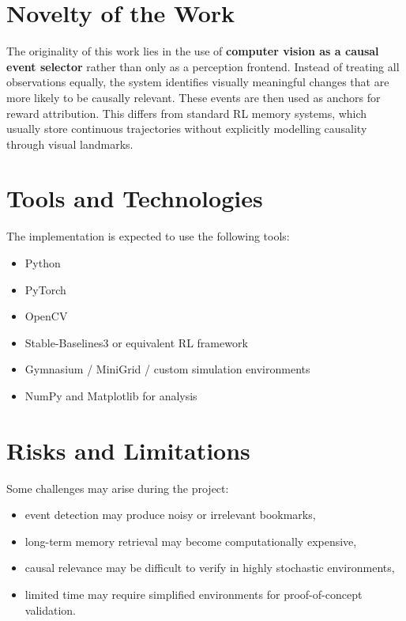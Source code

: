\documentclass[12pt,a4paper]{article}
\begin{document}
\section{Novelty of the Work}

The originality of this work lies in the use of \textbf{computer vision as a causal event selector} rather than only as a perception frontend. Instead of treating all observations equally, the system identifies visually meaningful changes that are more likely to be causally relevant. These events are then used as anchors for reward attribution. This differs from standard RL memory systems, which usually store continuous trajectories without explicitly modelling causality through visual landmarks.

\section{Tools and Technologies}

The implementation is expected to use the following tools:

\begin{itemize}
    \item Python
    \item PyTorch
    \item OpenCV
    \item Stable-Baselines3 or equivalent RL framework
    \item Gymnasium / MiniGrid / custom simulation environments
    \item NumPy and Matplotlib for analysis
\end{itemize}

\section{Risks and Limitations}

Some challenges may arise during the project:

\begin{itemize}
    \item event detection may produce noisy or irrelevant bookmarks,
    \item long-term memory retrieval may become computationally expensive,
    \item causal relevance may be difficult to verify in highly stochastic environments,
    \item limited time may require simplified environments for proof-of-concept validation.
\end{itemize}
\end{document}
